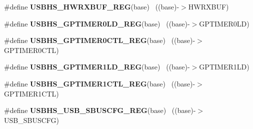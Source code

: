 \begin{DoxyCompactItemize}
\item 
\hypertarget{group___u_s_b_h_s___register___accessor___macros_ga5f966c7fea1aead7bb4fc7dae3bee88a}{}\#define {\bfseries U\+S\+B\+H\+S\+\_\+\+H\+W\+R\+X\+B\+U\+F\+\_\+\+R\+E\+G}(base)                                ~((base)-\/$>$H\+W\+R\+X\+B\+U\+F)\label{group___u_s_b_h_s___register___accessor___macros_ga5f966c7fea1aead7bb4fc7dae3bee88a}

\item 
\hypertarget{group___u_s_b_h_s___register___accessor___macros_ga26cccf49563a903e4577098e46f40c1f}{}\#define {\bfseries U\+S\+B\+H\+S\+\_\+\+G\+P\+T\+I\+M\+E\+R0\+L\+D\+\_\+\+R\+E\+G}(base)                          ~((base)-\/$>$G\+P\+T\+I\+M\+E\+R0\+L\+D)\label{group___u_s_b_h_s___register___accessor___macros_ga26cccf49563a903e4577098e46f40c1f}

\item 
\hypertarget{group___u_s_b_h_s___register___accessor___macros_ga92fe21aa45bd691b7f5ea09a5c681b8a}{}\#define {\bfseries U\+S\+B\+H\+S\+\_\+\+G\+P\+T\+I\+M\+E\+R0\+C\+T\+L\+\_\+\+R\+E\+G}(base)                        ~((base)-\/$>$G\+P\+T\+I\+M\+E\+R0\+C\+T\+L)\label{group___u_s_b_h_s___register___accessor___macros_ga92fe21aa45bd691b7f5ea09a5c681b8a}

\item 
\hypertarget{group___u_s_b_h_s___register___accessor___macros_gaa20eed206f5a1fda1d7f34f17a02c5c4}{}\#define {\bfseries U\+S\+B\+H\+S\+\_\+\+G\+P\+T\+I\+M\+E\+R1\+L\+D\+\_\+\+R\+E\+G}(base)                          ~((base)-\/$>$G\+P\+T\+I\+M\+E\+R1\+L\+D)\label{group___u_s_b_h_s___register___accessor___macros_gaa20eed206f5a1fda1d7f34f17a02c5c4}

\item 
\hypertarget{group___u_s_b_h_s___register___accessor___macros_ga58c4e785103f608c9be39e401d74032c}{}\#define {\bfseries U\+S\+B\+H\+S\+\_\+\+G\+P\+T\+I\+M\+E\+R1\+C\+T\+L\+\_\+\+R\+E\+G}(base)                        ~((base)-\/$>$G\+P\+T\+I\+M\+E\+R1\+C\+T\+L)\label{group___u_s_b_h_s___register___accessor___macros_ga58c4e785103f608c9be39e401d74032c}

\item 
\hypertarget{group___u_s_b_h_s___register___accessor___macros_ga4e8eda9e60365e69ee77dca840759130}{}\#define {\bfseries U\+S\+B\+H\+S\+\_\+\+U\+S\+B\+\_\+\+S\+B\+U\+S\+C\+F\+G\+\_\+\+R\+E\+G}(base)                        ~((base)-\/$>$U\+S\+B\+\_\+\+S\+B\+U\+S\+C\+F\+G)\label{group___u_s_b_h_s___register___accessor___macros_ga4e8eda9e60365e69ee77dca840759130}


\end{DoxyCompactItemize}
